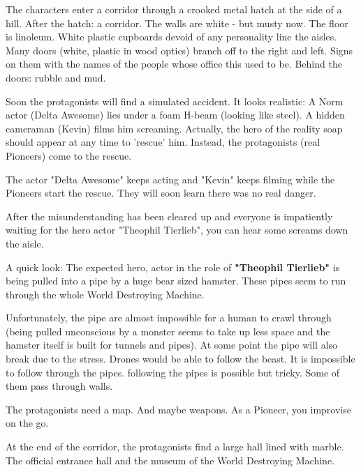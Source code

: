 The characters enter a corridor through a crooked metal hatch at the side of a hill. After the hatch: a corridor. The walls are white - but musty now. The floor is linoleum.
White plastic cupboards devoid of any personality line the aisles. Many doors (white, plastic in wood optics) branch off to the right and left. Signs on them with the names of the people whose office this used to be. Behind the doors: rubble and mud.


Soon the protagonists will find a simulated accident. It looks realistic: A Norm actor (Delta Awesome) lies under a foam H-beam (looking like steel). A hidden cameraman (Kevin) films him screaming. Actually, the hero of the reality soap should appear at any time to 'rescue' him. Instead, the protagonists (real Pioneers) come to the rescue.

The actor "Delta Awesome" keeps acting and "Kevin" keeps filming while the Pioneers start the rescue. They will soon learn there was no real danger.

After the misunderstanding has been cleared up and everyone is impatiently waiting for the hero actor "Theophil Tierlieb", you can hear some screams down the aisle.

A quick look: The expected hero, actor in the role of \textbf{"Theophil Tierlieb"} is being pulled into a pipe by a huge bear sized hamster. These pipes seem to run through the whole World Destroying Machine.

Unfortunately, the pipe are almost impossible for a human to crawl through (being pulled unconscious by a monster seems to take up less space and the hamster itself is built for tunnels and pipes). At some point the pipe will also break due to the stress. Drones would be able to follow the beast. It is impossible to follow through the pipes. following the pipes is possible but tricky. Some of them pass through walls.

The protagonists need a map. And maybe weapons. As a Pioneer, you improvise on the go.

At the end of the corridor, the protagonists find a large hall lined with marble. The official entrance hall and the museum of the World Destroying Machine.

